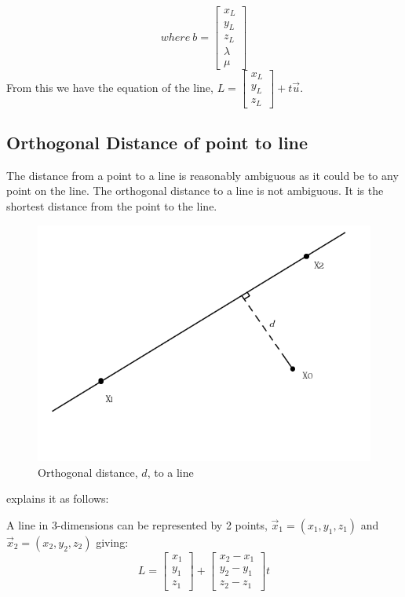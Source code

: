 	\[
	where\: b = 	\begin{bmatrix}
		x_L \\
		y_L\\
		z_L \\
		\lambda \\
		\mu 
	\end{bmatrix}
	\]
	\newline
	\newline
	From this we have the equation of the line, $L = \begin{bmatrix}
	x_L \\
	y_L\\
	z_L 
	\end{bmatrix} + t\vec{u}$.
	
	\subsection{Orthogonal Distance of point to line}
	\label{DistanceOfPointToLine}
	The distance from a point to a line is reasonably ambiguous as it could be to any point on the line. The orthogonal distance to a line is not ambiguous. It is the shortest distance from the point to the line.
	
	\begin{figure}[H]
		\centering
		\includegraphics[width=0.7\linewidth]{"Includes/images/OrthogDist to line"}
		\caption{Orthogonal distance, $d$, to a  line}
		\label{fig:OrthogDisttoline}
	\end{figure}
	
	\noindent\cite{weisstein_point-line_????} explains it as follows:
	
	A line in 3-dimensions can be represented by 2 points, $\vec{x}_1 = (x_1,y_1,z_1)$ and $\vec{x}_2 = (x_2,y_2,z_2)$ giving:\\
	
	\begin{equation}\label{LineEqn}
	L = \begin{bmatrix}
	x_1 \\
	y_1\\
	z_1 
	\end{bmatrix} + \begin{bmatrix}
	x_2 - x_1 \\
	y_2 - y_1\\
	z_2 - z_1
	\end{bmatrix}t
	\end{equation}
	
